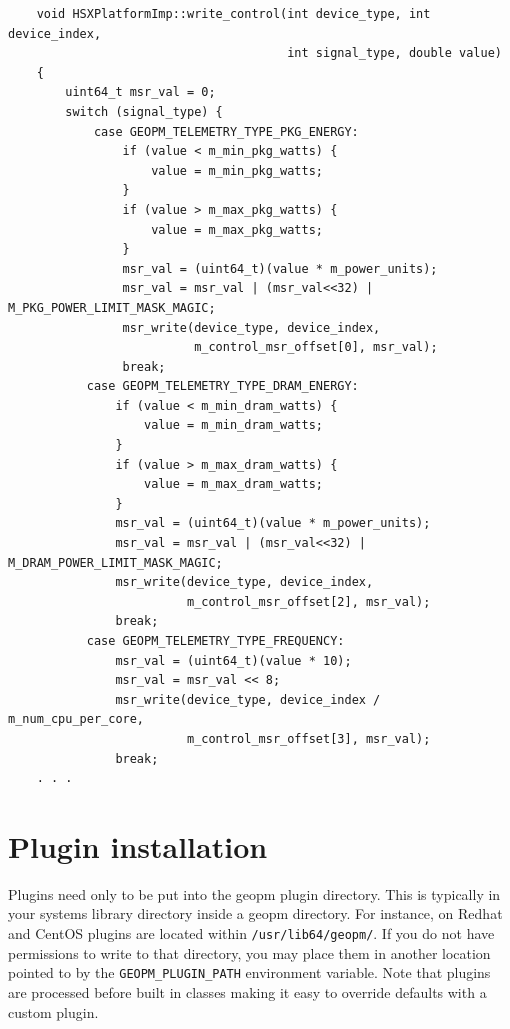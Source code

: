 \documentclass[11pt]{article}
\begin{document}
\begin{verbatim}
    void HSXPlatformImp::write_control(int device_type, int device_index,
                                       int signal_type, double value)
    {
        uint64_t msr_val = 0;
        switch (signal_type) {
            case GEOPM_TELEMETRY_TYPE_PKG_ENERGY:
                if (value < m_min_pkg_watts) {
                    value = m_min_pkg_watts;
                }
                if (value > m_max_pkg_watts) {
                    value = m_max_pkg_watts;
                }
                msr_val = (uint64_t)(value * m_power_units);
                msr_val = msr_val | (msr_val<<32) | M_PKG_POWER_LIMIT_MASK_MAGIC;
                msr_write(device_type, device_index,
                          m_control_msr_offset[0], msr_val);
                break;
           case GEOPM_TELEMETRY_TYPE_DRAM_ENERGY:
               if (value < m_min_dram_watts) {
                   value = m_min_dram_watts;
               }
               if (value > m_max_dram_watts) {
                   value = m_max_dram_watts;
               }
               msr_val = (uint64_t)(value * m_power_units);
               msr_val = msr_val | (msr_val<<32) | M_DRAM_POWER_LIMIT_MASK_MAGIC;
               msr_write(device_type, device_index,
                         m_control_msr_offset[2], msr_val);
               break;
           case GEOPM_TELEMETRY_TYPE_FREQUENCY:
               msr_val = (uint64_t)(value * 10);
               msr_val = msr_val << 8;
               msr_write(device_type, device_index / m_num_cpu_per_core,
                         m_control_msr_offset[3], msr_val);
               break;
    . . .
\end{verbatim}
\section{Plugin installation}
Plugins need only to be put into the geopm plugin directory. This is
typically in your systems library directory inside a geopm
directory. For instance, on Redhat and CentOS plugins are located
within \verb#/usr/lib64/geopm/#. If you do not have permissions to
write to that directory, you may place them in another location
pointed to by the \verb#GEOPM_PLUGIN_PATH# environment variable.  Note
that plugins are processed before built in classes making it easy to
override defaults with a custom plugin.

%
%
%
\end{document}
